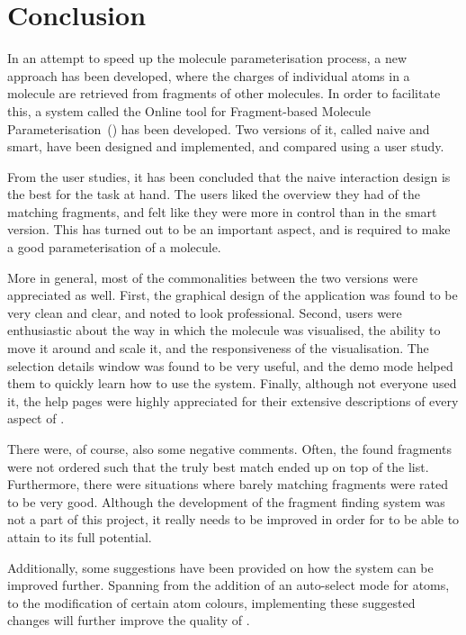 \chapter{Conclusion}

%

In an attempt to speed up the molecule parameterisation process, a new approach has been developed, where the charges of individual atoms in a molecule are retrieved from fragments of other molecules. In order to facilitate this, a system called the Online tool for Fragment-based Molecule Parameterisation~(\oframp) has been developed. Two versions of it, called naive and smart, have been designed and implemented, and compared using a user study.

From the user studies, it has been concluded that the naive interaction design is the best for the task at hand. The users liked the overview they had of the matching fragments, and felt like they were more in control than in the smart version. This has turned out to be an important aspect, and is required to make a good parameterisation of a molecule.

More in general, most of the commonalities between the two versions were appreciated as well. First, the graphical design of the application was found to be very clean and clear, and noted to look professional. Second, users were enthusiastic about the way in which the molecule was visualised, the ability to move it around and scale it, and the responsiveness of the visualisation. The selection details window was found to be very useful, and the demo mode helped them to quickly learn how to use the system. Finally, although not everyone used it, the help pages were highly appreciated for their extensive descriptions of every aspect of \oframp.

There were, of course, also some negative comments. Often, the found fragments were not ordered such that the truly best match ended up on top of the list. Furthermore, there were situations where barely matching fragments were rated to be very good. Although the development of the fragment finding system was not a part of this project, it really needs to be improved in order for \oframp{} to be able to attain to its full potential.

Additionally, some suggestions have been provided on how the system can be improved further. Spanning from the addition of an auto-select mode for atoms, to the modification of certain atom colours, implementing these suggested changes will further improve the quality of \oframp.

